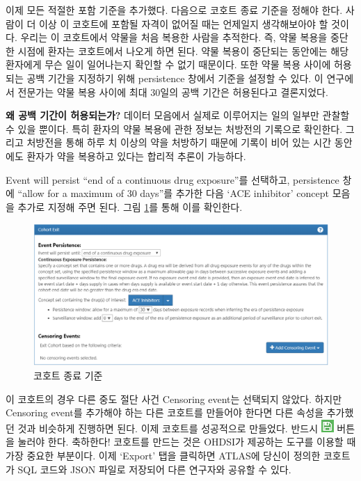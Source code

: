 \documentclass[10.5pt]{book}
\theoremstyle{definition}
\theoremstyle{definition}
\theoremstyle{definition}
\theoremstyle{remark}
\begin{document}
이제 모든 적절한 포함 기준을 추가했다. 다음으로 코호트 종료 기준을
정해야 한다. 사람이 더 이상 이 코호트에 포함될 자격이 없어질 때는
언제일지 생각해보아야 할 것이다. 우리는 이 코호트에서 약물을 처음 복용한
사람을 추적한다. 즉, 약물 복용을 중단한 시점에 환자는 코호트에서 나오게
하면 된다. 약물 복용이 중단되는 동안에는 해당 환자에게 무슨 일이
일어나는지 확인할 수 없기 때문이다. 또한 약물 복용 사이에 허용되는 공백
기간을 지정하기 위해 persistence 창에서 기준을 설정할 수 있다. 이
연구에서 전문가는 약물 복용 사이에 최대 30일의 공백 기간은 허용된다고
결론지었다.

\textbf{왜 공백 기간이 허용되는가?} 데이터 모음에서 실제로 이루어지는
일의 일부만 관찰할 수 있을 뿐이다. 특히 환자의 약물 복용에 관한 정보는
처방전의 기록으로 확인한다. 그리고 처방전을 통해 하루 치 이상의 약을
처방하기 때문에 기록이 비어 있는 시간 동안에도 환자가 약을 복용하고
있다는 합리적 추론이 가능하다.

Event will persist ``end of a continuous drug exposure''를 선택하고,
persistence 창에 ``allow for a maximum of 30 days''를 추가한 다음 `ACE
inhibitor' concept 모음을 추가로 지정해 주면 된다. 그림
\ref{fig:ATLAScohortexit}를 통해 이를 확인한다.

\begin{figure}

{\centering \includegraphics[width=1\linewidth]{images/Cohorts/cohort-exit} 

}

\caption{코호트 종료 기준}\label{fig:ATLAScohortexit}
\end{figure}

이 코호트의 경우 다른 중도 절단 사건 Censoring event는 선택되지 않았다.
하지만 Censoring event를 추가해야 하는 다른 코호트를 만들어야 한다면
다른 속성을 추가했던 것과 비슷하게 진행하면 된다. 이제 코호트를
성공적으로 만들었다. 반드시 \includegraphics{images/Cohorts/save.png}
버튼을 눌러야 한다. 축하한다! 코호트를 만드는 것은 OHDSI가 제공하는
도구를 이용할 때 가장 중요한 부분이다. 이제 `Export' 탭을 클릭하면
ATLAS에 당신이 정의한 코호트가 SQL 코드와 JSON 파일로 저장되어 다른
연구자와 공유할 수 있다.
\end{document}
